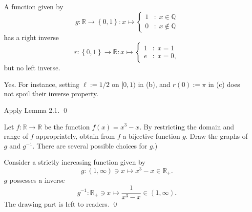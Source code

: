 \documentclass[a4paper,12pt]{article}
\begin{document}
\begin{sol}
	A function given by
	\begin{equation*}
		g:\mathbb{R} \to \left\{ 0,1 \right\}:
		x \mapsto \begin{cases}
			1 & \mathrm{\colon\;} x \in \mathbb{Q}    \\
			0 & \mathrm{\colon\;} x \notin \mathbb{Q}
		\end{cases}
	\end{equation*}
	has a right inverse
	\begin{equation*}
		r:\left\{ 0,1 \right\}\to \mathbb{R}:
		x \mapsto \begin{cases}
			1 & \mathrm{\colon\;} x =1  \\
			e & \mathrm{\colon\;} x =0,
		\end{cases}
	\end{equation*}
	but no left inverse.
	
	Yes. For instance, setting
	\( \ell :=1/2 \) on \( [0,1) \) in (b),
	and
	\( r(0) := \pi \) in (c)
	does not spoil their inverse property.
	
	Apply Lemma 2.1.
	\qed\end{sol}

\begin{exe}
	Let \( f:\mathbb{R} \to \mathbb{R} \) be the function \( f(x)=x^3 -x \).
	By restricting the domain and range of \( f \) appropriately,
	obtain from \( f \) a bijective function \( g \).
	Draw the graphs of \( g \) and \( g ^{-1} \).
	There are several possible choices for \( g \).)
\end{exe}\begin{sol}
	Consider a strictly increasing function given by
	\begin{equation*}
		g : (1,\infty) \ni x \mapsto x^3 -x \in \mathbb{R}_{+}.
	\end{equation*}
	\( g \)
	possesses a inverse
	\begin{equation*}
		g ^{-1}: \mathbb{R}_{+} \ni x \mapsto \frac{1}{x^3-x} \in (1,\infty).
	\end{equation*}
	The drawing part is left to readers.
	\qed\end{sol}
\end{document}

